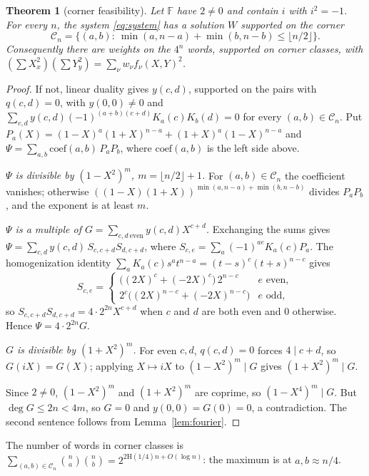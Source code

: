 \documentclass[11pt]{article}
\newtheorem{theorem}{Theorem}[section]
\theoremstyle{definition}
\theoremstyle{remark}
\newcommand{\F}{\mathbb{F}}
\newcommand{\Hb}{\mathrm{H}}
\begin{document}
\begin{theorem}[corner feasibility]\label{thm:corner}
Let $\F$ have $2\ne0$ and contain $i$ with $i^2=-1$. For every $n$, the system \eqref{eq:system} has a solution
$W$ supported on the \emph{corner}
\[
\mathcal C_n=\{(a,b):\ \min(a,n-a)+\min(b,n-b)\le\lfloor n/2\rfloor\}.
\]
Consequently there are weights on the $4^n$ words, supported on corner classes, with
$(\sum X_x^2)(\sum Y_y^2)=\sum_\nu w_\nu f_\nu(X,Y)^2$.
\end{theorem}
\begin{proof}
If not, linear duality gives $y(c,d)$, supported on the pairs with $q(c,d)=0$, with $y(0,0)\ne0$ and
$\sum_{c,d}y(c,d)(-1)^{(a+b)(c+d)}K_a(c)K_b(d)=0$ for every $(a,b)\in\mathcal C_n$. Put
$P_a(X)=(1-X)^a(1+X)^{n-a}+(1+X)^a(1-X)^{n-a}$ and
$\Psi=\sum_{a,b}\mathrm{coef}(a,b)\,P_aP_b$, where $\mathrm{coef}(a,b)$ is the left side above.

\emph{$\Psi$ is divisible by $(1-X^2)^m$, $m=\lfloor n/2\rfloor+1$.} For $(a,b)\in\mathcal C_n$ the coefficient
vanishes; otherwise $((1-X)(1+X))^{\min(a,n-a)+\min(b,n-b)}$ divides $P_aP_b$, and the exponent is at least $m$.

\emph{$\Psi$ is a multiple of $G=\sum_{c,d\ \text{even}}y(c,d)X^{c+d}$.} Exchanging the sums gives
$\Psi=\sum_{c,d}y(c,d)\,S_{c,c+d}S_{d,c+d}$, where $S_{c,e}=\sum_a(-1)^{ae}K_a(c)P_a$. The homogenization
identity $\sum_aK_a(c)s^at^{n-a}=(t-s)^c(t+s)^{n-c}$ gives
\[
S_{c,e}=\begin{cases}\bigl((2X)^c+(-2X)^c\bigr)\,2^{n-c}&e\text{ even},\\
2^c\bigl((2X)^{n-c}+(-2X)^{n-c}\bigr)&e\text{ odd},\end{cases}
\]
so $S_{c,c+d}S_{d,c+d}=4\cdot2^{2n}X^{c+d}$ when $c$ and $d$ are
both even and $0$ otherwise. Hence $\Psi=4\cdot2^{2n}G$.

\emph{$G$ is divisible by $(1+X^2)^m$.} For even $c,d$, $q(c,d)=0$ forces $4\mid c+d$, so $G(iX)=G(X)$; applying
$X\mapsto iX$ to $(1-X^2)^m\mid G$ gives $(1+X^2)^m\mid G$.

Since $2\ne0$, $(1-X^2)^m$ and $(1+X^2)^m$ are coprime, so $(1-X^4)^m\mid G$. But $\deg G\le2n<4m$, so $G=0$
and $y(0,0)=G(0)=0$, a contradiction. The second sentence follows from Lemma~\ref{lem:fourier}.
\end{proof}

The number of words in corner classes is $\sum_{(a,b)\in\mathcal C_n}\binom na\binom nb=2^{2\Hb(1/4)n+O(\log n)}$:
the maximum is at $a,b\approx n/4$.
\end{document}
